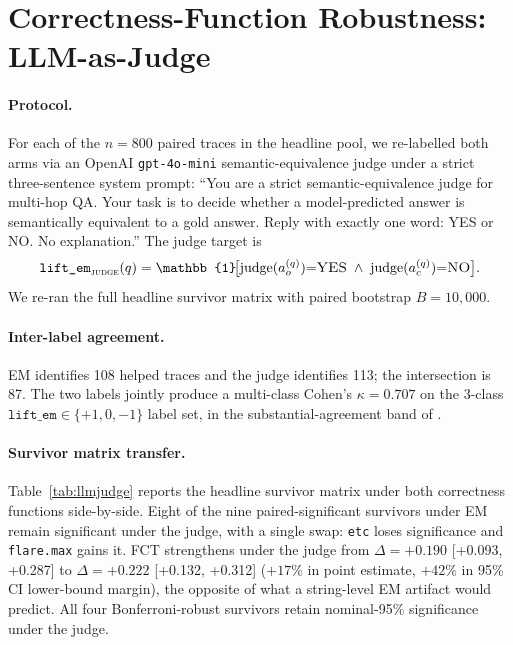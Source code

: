 \documentclass[11pt]{article}
\begin{document}
\section{Correctness-Function Robustness: LLM-as-Judge}
\label{sec:appendix-llmjudge}

\paragraph{Protocol.} For each of the $n{=}800$ paired traces in the headline pool, we re-labelled both arms via an OpenAI \texttt{gpt-4o-mini} semantic-equivalence judge under a strict three-sentence system prompt: ``You are a strict semantic-equivalence judge for multi-hop QA. Your task is to decide whether a model-predicted answer is semantically equivalent to a gold answer. Reply with exactly one word: YES or NO. No explanation.'' The judge target is
\begin{equation}
\texttt{lift\_em}_{\textsc{judge}}(q) = \mathbb{1}\!\bigl[\mathrm{judge}(a_o^{(q)}){=}\textsc{YES} \;\wedge\; \mathrm{judge}(a_c^{(q)}){=}\textsc{NO}\bigr].
\label{eq:lift-em-judge}
\end{equation}
We re-ran the full headline survivor matrix with paired bootstrap $B{=}10{,}000$.

\paragraph{Inter-label agreement.} EM identifies 108 helped traces and the judge identifies 113; the intersection is 87. The two labels jointly produce a multi-class Cohen's $\kappa = 0.707$ on the 3-class $\texttt{lift\_em} \in \{+1, 0, -1\}$ label set, in the substantial-agreement band of \citet{landis_measurement_1977}.

\paragraph{Survivor matrix transfer.} Table~\ref{tab:llmjudge} reports the headline survivor matrix under both correctness functions side-by-side. Eight of the nine paired-significant survivors under EM remain significant under the judge, with a single swap: \texttt{etc} loses significance and \texttt{flare.max} gains it. FCT strengthens under the judge from $\Delta = +0.190$ [+0.093, +0.287] to $\Delta = +0.222$ [+0.132, +0.312] ($+17\%$ in point estimate, $+42\%$ in 95\% CI lower-bound margin), the opposite of what a string-level EM artifact would predict. All four Bonferroni-robust survivors retain nominal-95\% significance under the judge.
\end{document}

